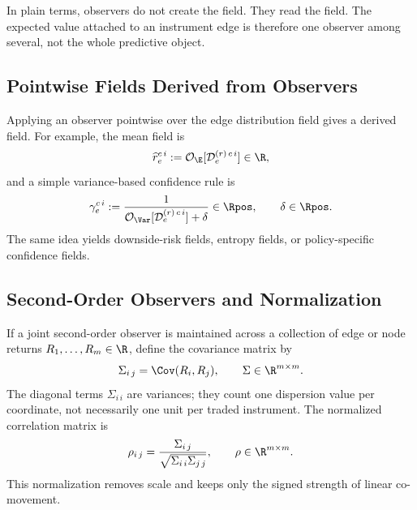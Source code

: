 In plain terms, observers do not create the field.  They read the field.  The
expected value attached to an instrument edge is therefore one observer among
several, not the whole predictive object.

\subsection{Pointwise Fields Derived from Observers}
\label{subsec:pointwise-fields-derived-from-observers}

Applying an observer pointwise over the edge distribution field gives a derived
field.  For example, the mean field is
\[
  \widehat{r}_{e}^{c\,i}
  :=
  \mathcal{O}_{\E}[\mathcal{D}_{e}^{(r)\,c\,i}]
  \in \R,
\]
and a simple variance-based confidence rule is
\[
  \gamma_{e}^{c\,i}
  :=
  \frac{1}{\mathcal{O}_{\Var}[\mathcal{D}_{e}^{(r)\,c\,i}] + \delta}
  \in \Rpos,
  \qquad
  \delta \in \Rpos.
\]
The same idea yields downside-risk fields, entropy fields, or policy-specific
confidence fields.

\subsection{Second-Order Observers and Normalization}
\label{subsec:second-order-observers-and-normalization}

If a joint second-order observer is maintained across a collection of edge or
node returns $R_1,\ldots,R_m \in \R$, define the covariance matrix by
\[
  \Sigma_{i\,j} = \Cov(R_i,R_j),
  \qquad
  \Sigma \in \R^{m \times m}.
\]
The diagonal terms $\Sigma_{i\,i}$ are variances; they count one dispersion value
per coordinate, not necessarily one unit per traded instrument.  The normalized
correlation matrix is
\[
  \rho_{i\,j} = \frac{\Sigma_{i\,j}}{\sqrt{\Sigma_{i\,i}\Sigma_{j\,j}}},
  \qquad
  \rho \in \R^{m \times m}.
\]
This normalization removes scale and keeps only the signed strength of linear
co-movement.
